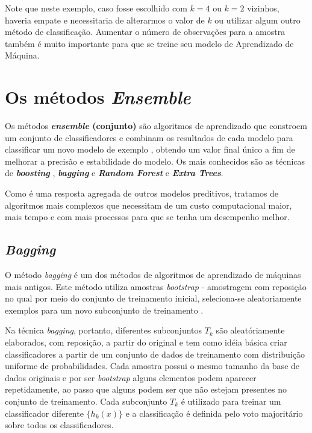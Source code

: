 \documentclass[
  openany]{book}
\begin{document}
Note que neste exemplo, caso fosse escolhido com \(k=4\) ou \(k=2\) vizinhos, haveria empate e necessitaria de alterarmos o valor de \(k\) ou utilizar algum outro método de classificação. Aumentar o número de observações para a amostra também é muito importante para que se treine seu modelo de Aprendizado de Máquina.

\hypertarget{ptIII}{%
\chapter{\texorpdfstring{Os métodos \emph{Ensemble}}{Os métodos Ensemble}}\label{ptIII}}

Os métodos \textbf{\emph{ensemble} (conjunto)} são algoritmos de aprendizado que constroem um conjunto de classificadores e combinam os resultados de cada modelo para classificar um novo modelo de exemplo \citep{dietterich2000ensemble}, obtendo um valor final único a fim de melhorar a precisão e estabilidade do modelo. Os mais conhecidos são as técnicas de \textbf{\emph{boosting}} \citep{freund1996experiments}, \textbf{\emph{bagging}} \citep{breiman1996bagging} e \textbf{\emph{Random Forest}} \citep{breiman2001random, liaw2002classification} e \textbf{\emph{Extra Trees}}.

Como é uma resposta agregada de outros modelos preditivos, tratamos de algoritmos mais complexos que necessitam de um custo computacional maior, mais tempo e com mais processos para que se tenha um desempenho melhor.

\hypertarget{bagging}{%
\section{\texorpdfstring{\emph{Bagging}}{Bagging}}\label{bagging}}

O método \emph{bagging} \citep{breiman1996bagging} é um dos métodos de algoritmos de aprendizado de máquinas mais antigos. Este método utiliza amostras \emph{bootstrap} - amostragem com reposição no qual por meio do conjunto de treinamento inicial, seleciona-se aleatoriamente exemplos para um novo subconjunto de treinamento \citep{oshiro2013abordagem}.

Na técnica \emph{bagging}, portanto, diferentes subconjuntos \(T_k\) são aleatóriamente elaborados, com reposição, a partir do original e tem como idéia básica criar classificadores a partir de um conjunto de dados de treinamento com distribuição uniforme de probabilidades. Cada amostra possui o mesmo tamanho da base de dados originais e por ser \emph{bootstrap} alguns elementos podem aparecer repetidamente, ao passo que alguns podem ser que não estejam presentes no conjunto de treinamento. Cada subconjunto \(T_k\) é utilizado para treinar um classificador diferente \(\{h_k(x)\}\) e a classificação é definida pelo voto majoritário sobre todos os classificadores.
\end{document}
